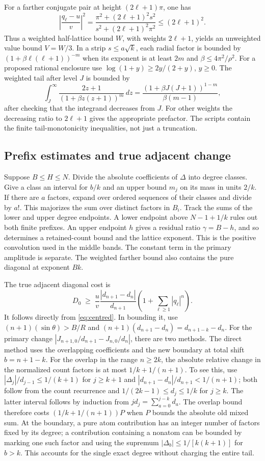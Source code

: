 \documentclass[11pt,reqno]{amsart}
\theoremstyle{remark}
\begin{document}
For a farther conjugate pair at height $(2\ell+1)\pi$, one has
\[
 \left|\frac{q_\ell-u}{v}\right|^2=
 \frac{\pi^2+(2\ell+1)^2s^2}{s^2+(2\ell+1)^2\pi^2}
 \le (2\ell+1)^2.
\]
Thus a weighted half-lattice bound $W$, with weights $2\ell+1$, yields an unweighted value bound $V=W/3$. In a strip $s\le a\sqrt{k}$, each radial factor is bounded by
$(1+\beta \ell(\ell+1))^{-m}$ when its exponent is at least $2m$ and $\beta\le4\pi^2/\rho^2$. For a proposed rational enclosure use
$\log(1+y)\ge2y/(2+y)$, $y\ge0$. The weighted tail after level $J$ is bounded by
\[
 \int_J^\infty \frac{2z+1}{(1+\beta z(z+1))^m}\,dz
 =\frac{(1+\beta J(J+1))^{1-m}}{\beta(m-1)},
\]
after checking that the integrand decreases from $J$. For other weights the decreasing ratio to $2\ell+1$ gives the appropriate prefactor. The scripts contain the finite tail-monotonicity inequalities, not just a truncation.

\subsection{Prefix estimates and true adjacent change}
Suppose $B\le H\le N$. Divide the absolute coefficients of $\Delta$ into degree classes. Give a class an interval for $b/k$ and an upper bound $m_j$ on its mass in units $2/k$. If there are $a$ factors, expand over ordered sequences of their classes and divide by $a!$. This majorizes the sum over distinct factors in $B_i$. Track the sums of the lower and upper degree endpoints. A lower endpoint above $N-1+1/k$ rules out both finite prefixes. An upper endpoint $h$ gives a residual ratio $\gamma=B-h$, and so determines a retained-count bound and the lattice exponent. This is the positive convolution used in the middle bands. The constant term in the primary amplitude is separate. The weighted farther bound also contains the pure diagonal at exponent $Bk$.

The true adjacent diagonal cost is
\begin{equation}\label{eq:diag}
 D_0\;\ge\;
 \frac{u}{v}\frac{|d_{n+1}-d_n|}{d_{n+1}}
 \left(1+\sum_{\ell\ge1}|q_\ell|^n\right).
\end{equation}
It follows directly from \eqref{eq:centred}. In bounding it, use $(n+1)(\sin\theta)>B/R$ and
$(n+1)(d_{n+1}-d_n)=d_{n+1-k}-d_n$. For the primary change
$|J_{n+1,0}/d_{n+1}-J_{n,0}/d_n|$, there are two methods. The direct method uses the overlapping coefficients and the new boundary at total shift $b=n+1-k$.
For the overlap in the range $n\ge2k$, the absolute relative change in the normalized count factors is at most $1/k+1/(n+1)$. To see this, use
$|\Delta_j|/d_{j-1}\le 1/(k+1)$ for $j\ge k+1$ and
$|d_{n+1}-d_n|/d_{n+1}<1/(n+1)$; both follow from the count recurrence and $1/(2k-1)\le d_j\le1/k$ for $j\ge k$. The latter interval follows by induction from $j d_j=\sum_{a=0}^{j-k}d_a$. The overlap bound therefore costs $(1/k+1/(n+1))P$ when $P$ bounds the absolute old mixed sum. At the boundary, a pure atom contribution has an integer number of factors fixed by its degree; a contribution containing a nonatom can be bounded by marking one such factor and using the supremum $|\Delta_b|\le1/[k(k+1)]$ for $b>k$. This accounts for the single exact degree without charging the entire tail.
\end{document}
